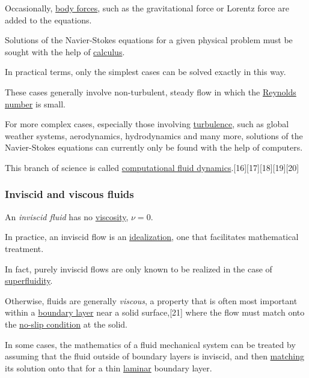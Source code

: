 \documentclass{article}
\begin{document}
Occasionally, \href{https://en.wikipedia.org/wiki/Body_force}{body forces}, such as the gravitational force or Lorentz force are added to the equations.

%
Solutions of the Navier-Stokes equations for a given physical problem must be sought with the help of \href{https://en.wikipedia.org/wiki/Calculus}{calculus}.

In practical terms, only the simplest cases can be solved exactly in this way.

These cases generally involve non-turbulent, steady flow in which the \href{https://en.wikipedia.org/wiki/Reynolds_number}{Reynolds number} is small.

For more complex cases, especially those involving \href{https://en.wikipedia.org/wiki/Turbulence}{turbulence}, such as global weather systems, aerodynamics, hydrodynamics and many more, solutions of the Navier-Stokes equations can currently only be found with the help of computers.

This branch of science is called \href{https://en.wikipedia.org/wiki/Computational_fluid_dynamics}{computational fluid dynamics}.[16][17][18][19][20]

\subsubsection{Inviscid and viscous fluids}
An \textit{inviscid fluid} has no \href{https://en.wikipedia.org/wiki/Viscosity}{viscosity}, $\nu = 0$.

In practice, an inviscid flow is an \href{https://en.wikipedia.org/wiki/Ideal_fluid}{idealization}, one that facilitates mathematical treatment.

In fact, purely inviscid flows are only known to be realized in the case of \href{https://en.wikipedia.org/wiki/Superfluidity}{superfluidity}.

Otherwise, fluids are generally \textit{viscous}, a property that is often most important within a \href{https://en.wikipedia.org/wiki/Boundary_layer}{boundary layer} near a solid surface,[21] where the flow must match onto the \href{https://en.wikipedia.org/wiki/No-slip_condition}{no-slip condition} at the solid.

In some cases, the mathematics of a fluid mechanical system can be treated by assuming that the fluid outside of boundary layers is inviscid, and then \href{https://en.wikipedia.org/wiki/Method_of_matched_asymptotic_expansions}{matching} its solution onto that for a thin \href{https://en.wikipedia.org/wiki/Laminar_flow}{laminar} boundary layer.
\end{document}
